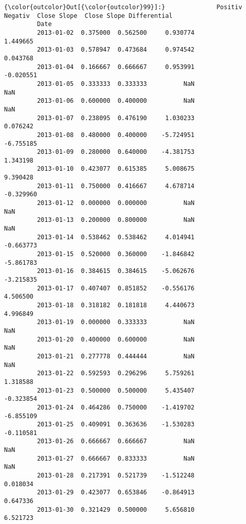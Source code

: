 \documentclass[11pt]{article}
\begin{document}
\begin{Verbatim}[commandchars=\\\{\}]
{\color{outcolor}Out[{\color{outcolor}99}]:}              Positiv   Negativ  Close Slope  Close Slope Differential
         Date                                                                 
         2013-01-02  0.375000  0.562500     0.930774                  1.449665
         2013-01-03  0.578947  0.473684     0.974542                  0.043768
         2013-01-04  0.166667  0.666667     0.953991                 -0.020551
         2013-01-05  0.333333  0.333333          NaN                       NaN
         2013-01-06  0.600000  0.400000          NaN                       NaN
         2013-01-07  0.238095  0.476190     1.030233                  0.076242
         2013-01-08  0.480000  0.400000    -5.724951                 -6.755185
         2013-01-09  0.280000  0.640000    -4.381753                  1.343198
         2013-01-10  0.423077  0.615385     5.008675                  9.390428
         2013-01-11  0.750000  0.416667     4.678714                 -0.329960
         2013-01-12  0.000000  0.000000          NaN                       NaN
         2013-01-13  0.200000  0.800000          NaN                       NaN
         2013-01-14  0.538462  0.538462     4.014941                 -0.663773
         2013-01-15  0.520000  0.360000    -1.846842                 -5.861783
         2013-01-16  0.384615  0.384615    -5.062676                 -3.215835
         2013-01-17  0.407407  0.851852    -0.556176                  4.506500
         2013-01-18  0.318182  0.181818     4.440673                  4.996849
         2013-01-19  0.000000  0.333333          NaN                       NaN
         2013-01-20  0.400000  0.600000          NaN                       NaN
         2013-01-21  0.277778  0.444444          NaN                       NaN
         2013-01-22  0.592593  0.296296     5.759261                  1.318588
         2013-01-23  0.500000  0.500000     5.435407                 -0.323854
         2013-01-24  0.464286  0.750000    -1.419702                 -6.855109
         2013-01-25  0.409091  0.363636    -1.530283                 -0.110581
         2013-01-26  0.666667  0.666667          NaN                       NaN
         2013-01-27  0.666667  0.833333          NaN                       NaN
         2013-01-28  0.217391  0.521739    -1.512248                  0.018034
         2013-01-29  0.423077  0.653846    -0.864913                  0.647336
         2013-01-30  0.321429  0.500000     5.656810                  6.521723

\end{Verbatim}
\end{document}
